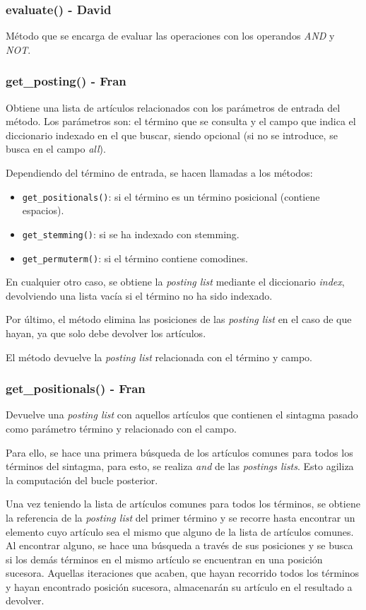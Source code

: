 \documentclass[12pt,a4paper]{article}
\begin{document}
\subsubsection{evaluate() - David}
Método que se encarga de evaluar las operaciones con los operandos \textit{AND} y \textit{NOT}.

\subsubsection{get\_posting() - Fran}
Obtiene una lista de artículos relacionados con los parámetros de entrada del método.
Los parámetros son: el término que se consulta y el campo que indica el diccionario indexado en el que buscar, siendo opcional (si no se introduce, se busca en el campo \textit{all}).

Dependiendo del término de entrada, se hacen llamadas a los métodos:
\begin{itemize}
    \item \texttt{get\_positionals()}: si el término es un término posicional (contiene espacios).
    \item \texttt{get\_stemming()}: si se ha indexado con stemming.
    \item \texttt{get\_permuterm()}: si el término contiene comodines.
\end{itemize}

En cualquier otro caso, se obtiene la \textit{posting list} mediante el diccionario \textit{index}, devolviendo una lista vacía si el término no ha sido indexado.

Por último, el método elimina las posiciones de las \textit{posting list} en el caso de que hayan, ya que solo debe devolver los artículos.

El método devuelve la \textit{posting list} relacionada con el término y campo.

\subsubsection{get\_positionals() - Fran}
Devuelve una \textit{posting list} con aquellos artículos que contienen el sintagma pasado como parámetro término y relacionado con el campo.

Para ello, se hace una primera búsqueda de los artículos comunes para todos los términos del sintagma, para esto, se realiza \textit{and} de las \textit{postings lists}. Esto agiliza la computación del bucle posterior.

Una vez teniendo la lista de artículos comunes para todos los términos, se obtiene la referencia de la \textit{posting list} del primer término y se recorre hasta encontrar un elemento cuyo artículo sea el mismo que alguno de la lista de artículos comunes. Al encontrar alguno, se hace una búsqueda a través de sus posiciones y se busca si los demás términos en el mismo artículo se encuentran en una posición sucesora. Aquellas iteraciones que acaben, que hayan recorrido todos los términos y hayan encontrado posición sucesora, almacenarán su artículo en el resultado a devolver.
\end{document}
